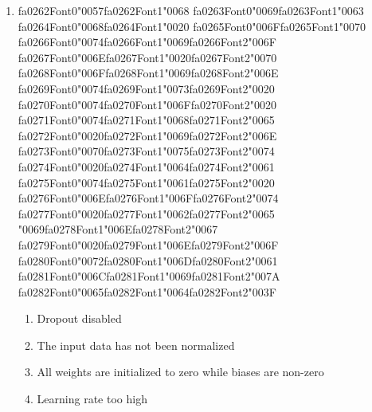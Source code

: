\documentclass[12pt]{article}
\begin{document}
\begin{enumerate}[label=Q\arabic*.]
 \item {\csname fa0262Font0\endcsname\char"0057}{\csname fa0262Font1\endcsname\char"0068} {\csname fa0263Font0\endcsname\char"0069}{\csname fa0263Font1\endcsname\char"0063} {\csname fa0264Font0\endcsname\char"0068}{\csname fa0264Font1\endcsname\char"0020} {\csname fa0265Font0\endcsname\char"006F}{\csname fa0265Font1\endcsname\char"0070} {\csname fa0266Font0\endcsname\char"0074}{\csname fa0266Font1\endcsname\char"0069}{\csname fa0266Font2\endcsname\char"006F} {\csname fa0267Font0\endcsname\char"006E}{\csname fa0267Font1\endcsname\char"0020}{\csname fa0267Font2\endcsname\char"0070} {\csname fa0268Font0\endcsname\char"006F}{\csname fa0268Font1\endcsname\char"0069}{\csname fa0268Font2\endcsname\char"006E} {\csname fa0269Font0\endcsname\char"0074}{\csname fa0269Font1\endcsname\char"0073}{\csname fa0269Font2\endcsname\char"0020} {\csname fa0270Font0\endcsname\char"0074}{\csname fa0270Font1\endcsname\char"006F}{\csname fa0270Font2\endcsname\char"0020} {\csname fa0271Font0\endcsname\char"0074}{\csname fa0271Font1\endcsname\char"0068}{\csname fa0271Font2\endcsname\char"0065} {\csname fa0272Font0\endcsname\char"0020}{\csname fa0272Font1\endcsname\char"0069}{\csname fa0272Font2\endcsname\char"006E} {\csname fa0273Font0\endcsname\char"0070}{\csname fa0273Font1\endcsname\char"0075}{\csname fa0273Font2\endcsname\char"0074} {\csname fa0274Font0\endcsname\char"0020}{\csname fa0274Font1\endcsname\char"0064}{\csname fa0274Font2\endcsname\char"0061} {\csname fa0275Font0\endcsname\char"0074}{\csname fa0275Font1\endcsname\char"0061}{\csname fa0275Font2\endcsname\char"0020} {\csname fa0276Font0\endcsname\char"006E}{\csname fa0276Font1\endcsname\char"006F}{\csname fa0276Font2\endcsname\char"0074} {\csname fa0277Font0\endcsname\char"0020}{\csname fa0277Font1\endcsname\char"0062}{\csname fa0277Font2\endcsname\char"0065} {\char"0069}{\csname fa0278Font1\endcsname\char"006E}{\csname fa0278Font2\endcsname\char"0067} {\csname fa0279Font0\endcsname\char"0020}{\csname fa0279Font1\endcsname\char"006E}{\csname fa0279Font2\endcsname\char"006F} {\csname fa0280Font0\endcsname\char"0072}{\csname fa0280Font1\endcsname\char"006D}{\csname fa0280Font2\endcsname\char"0061} {\csname fa0281Font0\endcsname\char"006C}{\csname fa0281Font1\endcsname\char"0069}{\csname fa0281Font2\endcsname\char"007A} {\csname fa0282Font0\endcsname\char"0065}{\csname fa0282Font1\endcsname\char"0064}{\csname fa0282Font2\endcsname\char"003F}
 \begin{enumerate}[label=(\Alph*)]
     \item Dropout disabled
     \item The input data has not been normalized
     \item All weights are initialized to zero while biases are non-zero
     \item Learning rate too high
 \end{enumerate}
 

\end{enumerate}
\end{document}
